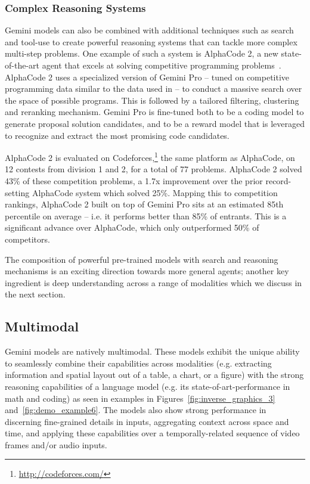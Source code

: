  \subsubsection{Complex Reasoning Systems}
\label{sec:complex-reasoning}
Gemini models can also be combined with additional techniques such as search and tool-use to create powerful reasoning systems that can tackle more complex multi-step problems. One example of such a system is AlphaCode 2, a new state-of-the-art agent that excels at solving competitive programming problems~\citep{gdm2023alphacode2}. AlphaCode 2 uses a specialized version of Gemini Pro – tuned on competitive programming data similar to the data used in \citet{alphacode} – to conduct a massive search over the space of possible programs. This is followed by a tailored filtering, clustering and reranking mechanism. Gemini Pro is fine-tuned both to be a coding model to generate proposal solution candidates, and to be a reward model that is leveraged to recognize and extract the most promising code candidates.

AlphaCode 2 is evaluated on Codeforces,\footnote{\url{http://codeforces.com/}} the same platform as AlphaCode, on 12 contests from division 1 and 2, for a total of 77 problems. AlphaCode 2 solved 43\% of these competition problems, a 1.7x improvement over the prior record-setting AlphaCode system which solved 25\%. Mapping this to competition rankings, AlphaCode 2 built on top of Gemini Pro sits at an estimated 85th percentile on average – i.e. it performs better than 85\% of entrants. This is a significant advance over AlphaCode, which only outperformed 50\% of competitors.

The composition of powerful pre-trained models with search and reasoning mechanisms is an exciting direction towards more general agents; another key ingredient is deep understanding across a range of modalities which we discuss in the next section. 

\subsection{Multimodal}
\label{sec:mm}
Gemini models are natively multimodal. These models exhibit the unique ability to seamlessly combine their capabilities across modalities (e.g. extracting information and spatial layout out of a table, a chart, or a figure) with the strong reasoning capabilities of a language model (e.g. its state-of-art-performance in math and coding) as seen in examples in Figures~\ref{fig:inverse_graphics_3} and~\ref{fig:demo_example6}. 
The models also show strong performance in discerning fine-grained details in inputs, aggregating context across space and time, and applying these capabilities over a temporally-related sequence of video frames and/or audio inputs. 

